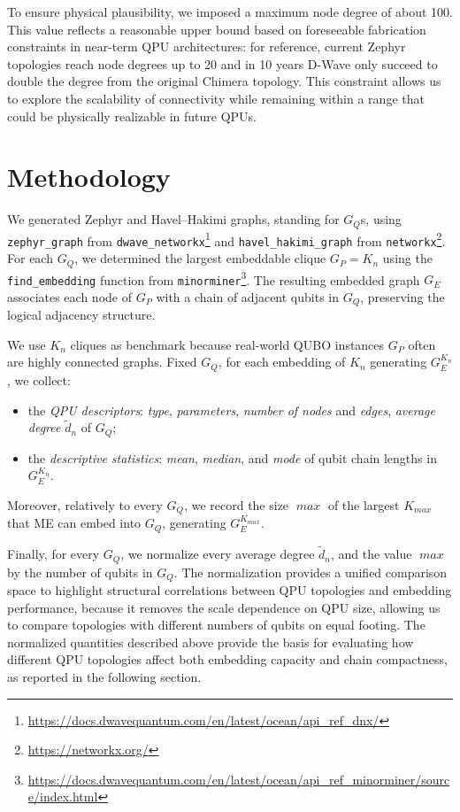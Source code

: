 \documentclass[11pt,acmsmall,nonacm]{acmart}
\begin{document}
To ensure physical plausibility, we imposed a maximum node degree of about 100.
This value reflects a reasonable upper bound based on foreseeable fabrication constraints in near-term QPU architectures: for reference, current Zephyr topologies reach node degrees up to 20 and in 10 years D-Wave only succeed to double the degree from the original Chimera topology.
This constraint allows us to explore the scalability of connectivity while remaining within a range that could be physically realizable in future QPUs.

\section{Methodology}

We generated Zephyr and Havel–Hakimi graphs, standing for $G_Q$s, using \texttt{zephyr\_graph} from \texttt{dwave\_networkx}\footnote{\url{https://docs.dwavequantum.com/en/latest/ocean/api_ref_dnx/}} and \texttt{havel\_hakimi\_graph} from \texttt{networkx}\footnote{\url{https://networkx.org/}}.
For each $G_Q$, we determined the largest embeddable clique $G_P = K_n$ using the \texttt{find\_embedding} function from \texttt{minorminer}\footnote{\url{https://docs.dwavequantum.com/en/latest/ocean/api_ref_minorminer/source/index.html}}.
The resulting embedded graph $G_E$ associates each node of $G_P$ with a chain of adjacent qubits in $G_Q$, preserving the logical adjacency structure.

We use $K_n$ cliques as benchmark because real-world QUBO instances $G_P$ often are highly connected graphs.
Fixed $G_Q$, for each embedding of $K_n$ generating $G_E^{K_n}$, we collect:
\begin{itemize}
  \item the \emph{QPU descriptors}: \emph{type}, \emph{parameters}, \emph{number of nodes} and \emph{edges}, \emph{average degree} $\tilde{d}_n$ of $G_Q$;
  \item the \emph{descriptive statistics}: \emph{mean}, \emph{median}, and \emph{mode} of qubit chain lengths in $G_E^{K_n}$.
\end{itemize}
Moreover, relatively to every $G_Q$, we record the size $\operatorname{\textit{max}}$ of the largest $K_{\operatorname{\textit{max}}}$ that ME can embed into $G_Q$, generating $G_E^{K_{\operatorname{\textit{max}}}}$.

Finally, for every $G_Q$, we normalize every average degree $\tilde{d}_n$, and the value $\operatorname{\textit{max}}$ by the number of qubits in $G_Q$.
The normalization provides a unified comparison space to highlight structural correlations between QPU topologies and embedding performance, because it removes the scale dependence on QPU size, allowing us to compare topologies with different numbers of qubits on equal footing.
The normalized quantities described above provide the basis for evaluating how different QPU topologies affect both embedding capacity and chain compactness, as reported in the following section.
\end{document}
